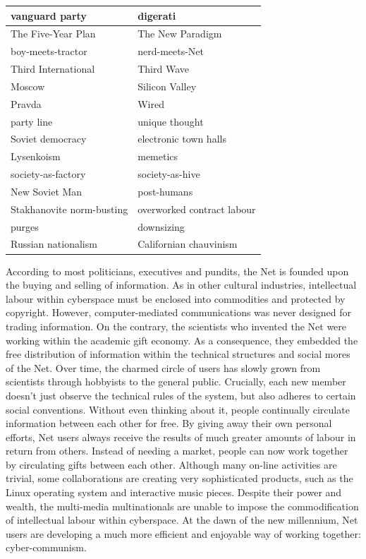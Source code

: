 \documentclass[letterpaper,12pt,english]{sphinxmanual}
\begin{document}
\begin{tabulary}{\linewidth}{|L|L|}
\hline

vanguard party
 & 
digerati
\\
\hline
The Five-Year Plan
 & 
The New Paradigm
\\
\hline
boy-meets-tractor
 & 
nerd-meets-Net
\\
\hline
Third International
 & 
Third Wave
\\
\hline
Moscow
 & 
Silicon Valley
\\
\hline
Pravda
 & 
Wired
\\
\hline
party line
 & 
unique thought
\\
\hline
Soviet democracy
 & 
electronic town halls
\\
\hline
Lysenkoism
 & 
memetics
\\
\hline
society-as-factory
 & 
society-as-hive
\\
\hline
New Soviet Man
 & 
post-humans
\\
\hline
Stakhanovite norm-busting
 & 
overworked contract labour
\\
\hline
purges
 & 
downsizing
\\
\hline
Russian nationalism
 & 
Californian chauvinism
\\
\hline\end{tabulary}


According to most politicians, executives and pundits, the Net is
founded upon the buying and selling of information. As in other cultural
industries, intellectual labour within cyberspace must be enclosed into
commodities and protected by copyright. However, computer-mediated
communications was never designed for trading information. On the
contrary, the scientists who invented the Net were working within the
academic gift economy. As a consequence, they embedded the free
distribution of information within the technical structures and social
mores of the Net. Over time, the charmed circle of users has slowly
grown from scientists through hobbyists to the general public.
Crucially, each new member doesn't just observe the technical rules of
the system, but also adheres to certain social conventions. Without even
thinking about it, people continually circulate information between each
other for free. By giving away their own personal efforts, Net users
always receive the results of much greater amounts of labour in return
from others. Instead of needing a market, people can now work together
by circulating gifts between each other. Although many on-line
activities are trivial, some collaborations are creating very
sophisticated products, such as the Linux operating system and
interactive music pieces. Despite their power and wealth, the
multi-media multinationals are unable to impose the commodification of
intellectual labour within cyberspace. At the dawn of the new
millennium, Net users are developing a much more efficient and enjoyable
way of working together: cyber-communism.
\end{document}
